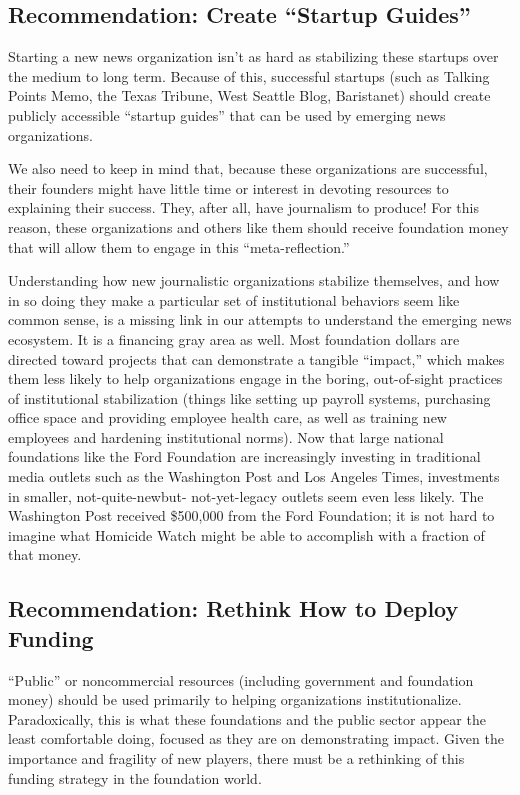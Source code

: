 \subsection{Recommendation: Create ``Startup Guides''}
Starting a new news organization isn’t as hard as stabilizing these startups
over the medium to long term. Because of this, successful startups
(such as Talking Points Memo, the Texas Tribune, West Seattle Blog,
Baristanet) should create publicly accessible ``startup guides'' that can be
used by emerging news organizations.

We also need to keep in mind that, because these organizations are
successful, their founders might have little time or interest in devoting
resources to explaining their success. They, after all, have journalism
to produce! For this reason, these organizations and others like them
should receive foundation money that will allow them to engage in this
``meta-reflection.''

Understanding how new journalistic organizations stabilize themselves, and how
in so doing they make a particular set of institutional behaviors seem like common
sense, is a missing link in our attempts to understand the emerging news
ecosystem. It is a financing gray area as well. Most foundation dollars are directed
toward projects that can demonstrate a tangible ``impact,'' which makes them
less likely to help organizations engage in the boring, out-of-sight practices of
institutional stabilization (things like setting up payroll systems, purchasing office
space and providing employee health care, as well as training new employees
and hardening institutional norms). Now that large national foundations like the
Ford Foundation are increasingly investing in traditional media outlets such as the
Washington Post and Los Angeles Times, investments in smaller, not-quite-newbut-
not-yet-legacy outlets seem even less likely. The Washington Post received
\$500,000 from the Ford Foundation; it is not hard to imagine what Homicide
Watch might be able to accomplish with a fraction of that money.

\subsection{Recommendation: Rethink How to Deploy Funding}
``Public'' or noncommercial resources (including government and foundation
money) should be used primarily to helping organizations institutionalize.
Paradoxically, this is what these foundations and the public
sector appear the least comfortable doing, focused as they are on demonstrating
impact. Given the importance and fragility of new players, there
must be a rethinking of this funding strategy in the foundation world.

